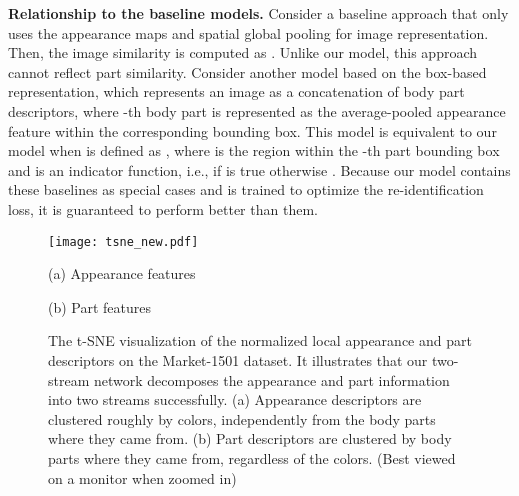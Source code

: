 \documentclass{llncs}
\begin{document}
\noindent\textbf{Relationship to the baseline models.} Consider a baseline approach that only uses the appearance maps and spatial global pooling for image representation. Then, the image similarity is computed as .
Unlike our model, this approach cannot reflect part similarity.
Consider another model based on the box-based representation, which represents an image as a concatenation of  body part descriptors, where -th body part is represented as the average-pooled appearance feature within the corresponding bounding box. This model is equivalent to our model when  is defined as , where  is the region within the -th part bounding box and  is an indicator function, i.e.,  if  is true otherwise .
Because our model contains these baselines as special cases and is trained to optimize the re-identification loss, it is guaranteed to perform better than them.

\begin{figure*}[t]
\centering  
	\begin{minipage}{0.99\linewidth}
	\texttt{[image: tsne\_new.pdf]} 
	\end{minipage}
\vspace{.2cm}

	\begin{minipage}{0.49\linewidth}
	\centering
	\small(a) Appearance features
	\end{minipage}
	\begin{minipage}{0.49\linewidth}
	\centering
	\small(b) Part features
	\end{minipage}
\vspace{-.3cm}
\caption{The t-SNE visualization of the normalized local appearance and part descriptors on the Market-1501 dataset. It illustrates that our two-stream network decomposes the appearance and part information into two streams successfully. (a) Appearance descriptors are clustered roughly by colors, independently from the body parts where they came from. (b) Part descriptors are clustered by body parts where they came from, regardless of the colors.
(Best viewed on a monitor when zoomed in)
} \label{fig:tsne}
\label{fig:separatemaps}
\end{figure*}
\end{document}
